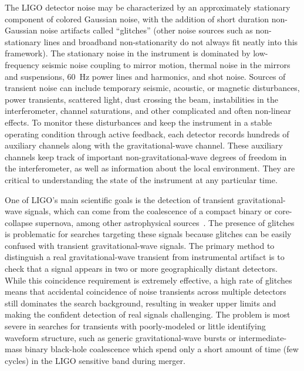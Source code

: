 \documentclass[prd, twocolumn, lengthcheck, superscriptaddress, showpacs, letterpaper, nofootinbib]{revtex4-1}
\begin{document}
The \ac{LIGO} detector noise may be characterized by an approximately stationary component of
colored Gaussian noise, with the addition of short duration non-Gaussian noise
artifacts called ``glitches'' (other noise sources such as non-stationary lines
and broadband non-stationarity do not always fit neatly into this framework).
The stationary noise in the instrument is dominated by low-frequency seismic
noise coupling to mirror motion, thermal noise in the mirrors and suspensions,
60~Hz power lines and harmonics, and shot noise.  Sources of transient noise
can include temporary seismic, acoustic, or magnetic disturbances, power
transients, scattered light, dust crossing the beam, instabilities in the
interferometer, channel saturations, and other complicated and often non-linear
effects. To monitor these disturbances and keep the instrument in a stable
operating condition through active feedback, each detector records hundreds of
auxiliary channels along with the gravitational-wave channel.  These auxiliary
channels keep track of important non-gravitational-wave degrees of freedom in
the interferometer, as well as information about the local environment. They
are critical to understanding the state of the instrument at any particular
time.

One of \ac{LIGO}'s main scientific goals is the detection of transient
gravitational-wave signals, which can come from the coalescence of a compact binary or
core-collapse supernova, among other astrophysical sources~\cite{Cutler:2001}.
The presence of glitches is problematic for searches targeting these signals
because glitches can be easily confused with transient gravitational-wave signals.
The primary method to distinguish a real gravitational-wave transient from
instrumental artifact is to check that a signal appears in two or more
geographically distant detectors. While this coincidence requirement is
extremely effective, a high rate of glitches means that accidental coincidence
of noise transients across multiple detectors still dominates the search
background, resulting in weaker upper limits and making the confident detection
of real signals challenging. The problem is most severe in searches for
transients with poorly-modeled or little identifying waveform structure, such
as generic gravitational-wave bursts or intermediate-mass binary black-hole
coalescence which spend only a short amount of time (few cycles) in the LIGO
sensitive band during merger.
\end{document}
